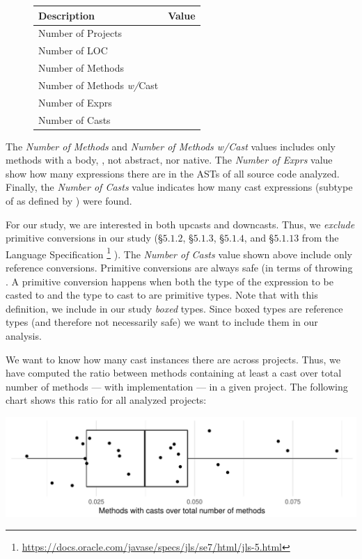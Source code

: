 \begin{figure}
\begin{center}
\begin{tabular}{lr}
	Description & Value\\
	\hline
	Number of Projects & \nproject{} \\
	Number of LOC & \nloc{} \\
	Number of Methods & \nmethod{} \\
	Number of Methods \emph{w/}Cast & \nmethodwithcast{} \\
	Number of Exprs & \nexpr{} \\
	Number of Casts & \ncast{} \\
\end{tabular}
\end{center}
\end{figure}

The \emph{Number of Methods} and \emph{Number of Methods w/Cast} values includes only methods with a body, \ie{}, not abstract, nor native.
The \emph{Number of Exprs} value show how many expressions there are in the ASTs of all source code analyzed.
Finally, the \emph{Number of Casts} value indicates how many cast expressions (subtype of  as defined by \ql{}) were found.

For our study, we are interested in both upcasts and downcasts.
Thus, we \emph{exclude} primitive conversions in our study
(\S$5.1.2$, \S$5.1.3$, \S$5.1.4$, and \S$5.1.13$ from the \java{} Language Specification%
\footnote{\url{https://docs.oracle.com/javase/specs/jls/se7/html/jls-5.html}}
).
The \emph{Number of Casts} value shown above include only reference conversions.
Primitive conversions are always safe (in terms of throwing .
A primitive conversion happens when both the type of the expression to be casted to and
the type to cast to are primitive types.
Note that with this definition, we include in our study \emph{boxed} types.
Since boxed types are reference types (and therefore not necessarily safe)
we want to include them in our analysis.

We want to know how many cast instances there are across projects.
Thus, we have computed the ratio between methods containing
at least a cast over total number of methods --- with implementation --- in a given project.
The following chart shows this ratio for all analyzed projects:

\includegraphics[width=\columnwidth,height=3.8cm]{stats-methodwcast.pdf}

